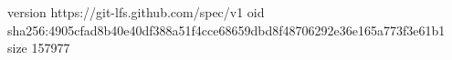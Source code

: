 version https://git-lfs.github.com/spec/v1
oid sha256:4905cfad8b40e40df388a51f4cce68659dbd8f48706292e36e165a773f3e61b1
size 157977
